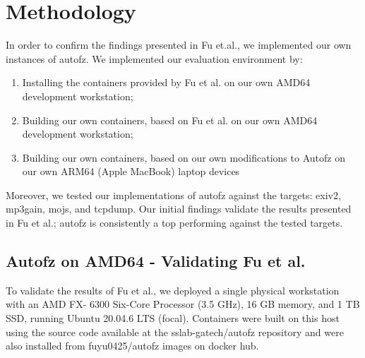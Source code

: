 \section{Methodology}

\newcommand{\pdiff}{diff_{peak}}

In order to confirm the findings presented in Fu et.al.\cite{fu_autofz_2023}, we implemented our 
own instances of autofz. We implemented our evaluation environment by:

\begin{enumerate}
    \item Installing the containers provided by Fu et al. \cite{fu_autofz_2023} on our own
    AMD64 development workstation;
    \item Building our own containers, based on Fu et al. \cite{fu_autofz_2023} on our own
    AMD64 development workstation;
    \item Building our own containers, based on our own modifications to Autofz on our own 
    ARM64 (Apple MacBook) laptop devices
\end{enumerate}

Moreover, we tested our implementations of autofz against the targets: exiv2, mp3gain, mojs, and 
tcpdump. Our initial findings validate the results presented in Fu et al.; autofz 
is consistently a top performing against the tested targets.

\subsection{Autofz on AMD64 - Validating Fu et al.\cite{fu_autofz_2023}}

To validate the results of Fu et al., we deployed a single physical workstation with 
an AMD FX\texttrademark - 6300 Six-Core Processor (3.5 GHz), 16 GB memory, and 1 TB 
SSD, running Ubuntu 20.04.6 LTS (focal). Containers were built on this host using 
the source code available at the sslab-gatech/autofz repository \cite{noauthor_sslab-gatechautofz_2024} 
and were also installed from fuyu0425/autofz images on docker hub\cite{noauthor_fuyu0425autofz_nodate}.


